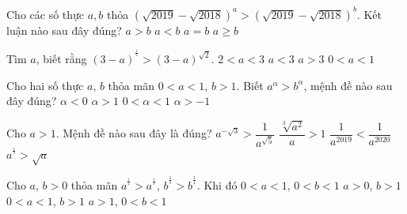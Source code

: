 \begin{ex}%
	Cho các số thực $a,b$ thỏa $(\sqrt{2019}-\sqrt{2018})^a>(\sqrt{2019}-\sqrt{2018})^b$. Kết luận nào sau đây đúng?
	\choice
	{$a>b$}
	{\True$a<b$}
	{$a=b$}
	{$a\geq b$}
\end{ex}
\begin{ex}%
	Tìm $a$, biết rằng $(3-a)^{^{\tfrac{1}{2}}}>(3-a)^{\sqrt{2}}$.
	\choice
	{\True $2<a<3$}
	{$a<3$}
	{$a>3$}
	{$0<a<1$}
\end{ex}
\begin{ex}%
	Cho hai số thực $a$, $b$ thỏa mãn $0<a<1$, $b>1$. Biết $a^\alpha>b^\alpha$, mệnh đề nào sau đây đúng?
	\choice
	{\True $\alpha<0$}
	{$\alpha>1$}
	{$0<\alpha<1$}
	{$\alpha>-1$}	
\end{ex}
\begin{ex}%
	Cho $ a>1$. Mệnh đề nào sau đây là đúng?
	\choice
	{\True $ a^{-\sqrt{3}}>\dfrac{1}{a^{\sqrt{5}}}$}
	{$\dfrac{\sqrt[3]{a^2}}{a}>1$}
	{$\dfrac{1}{a^{2019}}<\dfrac{1}{a^{2020}}$}
	{$ a^{^{\tfrac{1}{3}}}>\sqrt{a}$}
\end{ex}

\begin{ex}%
	Cho $a$, $b>0$ thỏa mãn $a^{^{\tfrac{1}{2}}}>a^{^{\tfrac{1}{3}}}$, $b^{^{\tfrac{2}{3}}}>b^{^{\tfrac{3}{4}}}$. Khi đó
	\choice
	{$ 0<a<1$, $0<b<1$}
	{$a>0$, $b>1$}
	{$0<a<1$, $b>1$}
	{\True $a>1$, $0<b<1$}
\end{ex}

